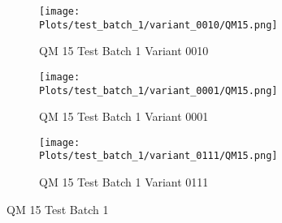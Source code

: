 \documentclass{DissertateFigs}
\begin{document}
\begin{figure}[t!]
\medskip

    \begin{subfigure}{0.32\textwidth}
    \texttt{[image: Plots/test\_batch\_1/variant\_0010/QM15.png]}
    \caption{QM 15 Test Batch 1 Variant 0010}
    \end{subfigure}
    \begin{subfigure}{0.32\textwidth}
    \texttt{[image: Plots/test\_batch\_1/variant\_0001/QM15.png]}
    \caption{QM 15 Test Batch 1 Variant 0001}
    \end{subfigure}

\medskip

    \begin{subfigure}{0.32\textwidth}
    \texttt{[image: Plots/test\_batch\_1/variant\_0111/QM15.png]}
    \caption{QM 15 Test Batch 1 Variant 0111}
    \end{subfigure}
\caption{QM 15 Test Batch 1}
    \end{figure}
\clearpage
\end{document}
